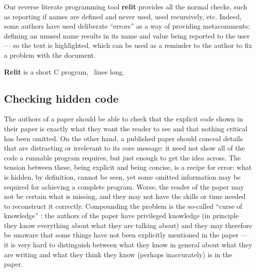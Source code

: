 \documentclass[12pt]{article}
\def\name#1{\textbf{#1}}
\begin{document}
Our reverse literate programming tool \name{relit} provides all the normal checks, such as reporting if names are defined and never used, used recursively, etc. 
Indeed, some authors have used deliberate ``errors'' as a way of providing metacomments: defining an unused name results in its name and value being reported to the user --- so the text is highlighted, which can be used as a reminder to the author to fix a problem with the document. 

\name{Relit} is a short C program, \ lines long.

\subsection{Checking hidden code}\label{invisible-code}
\def\seen{\color{black}\ttfamily\fontseries{l}\selectfont\global\def\endline{}}
\def\hidden{\ttfamily\fontseries{b}\selectfont\emph{$\ast\ast\ast$ hidden $\ast\ast\ast$}}
\def\unseen{\color{highlight-color}\ttfamily\fontseries{b}\selectfont\global\def\endline{\hfill~~\hidden}}

The authors of a paper should be able to check that the explicit code shown in their paper is exactly what they want the reader to see and that nothing critical has been omitted. On the other hand, a published paper should conceal details that are distracting or irrelevant to its core message: it need not show all of the code a runnable program requires, but just enough to get the idea across. The tension between these, being explicit and being concise, is a recipe for error: what is hidden, by definition, cannot be seen, yet some omitted information may be required for achieving a complete program. Worse, the reader of the paper may not be certain what is missing, and they may not have the skills or time needed to reconstruct it correctly. Compounding the problem is the so-called ``curse of knowledge'' \cite{pinker}: the authors of the paper have privileged knowledge (in principle they know everything about what they are talking about) and they may therefore be unaware that some things have not been explicitly mentioned in the paper --- it is very hard to distinguish between what they know in general about what they are writing and what they think they know (perhaps inaccurately) is in the paper.
\end{document}
